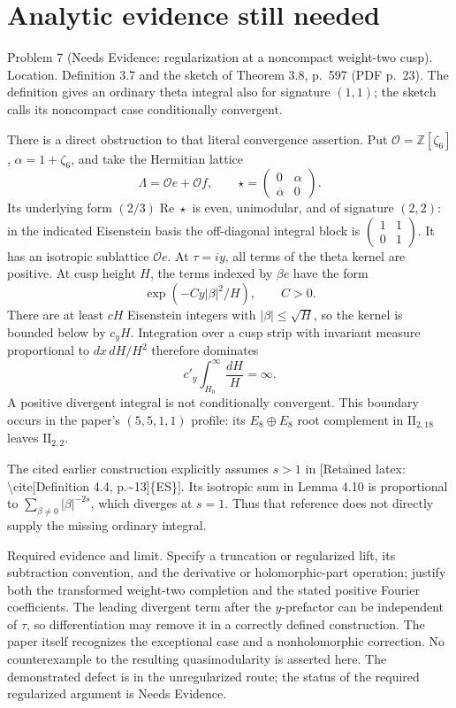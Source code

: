 \documentclass[10pt]{article}
\begin{document}
\section*{Analytic evidence still needed}
Problem 7 (Needs Evidence: regularization at a noncompact weight-two cusp).  Location. Definition 3.7 and the sketch of Theorem 3.8, p. 597 (PDF p. 23). The definition gives an ordinary theta integral also for signature \((1,1)\); the sketch calls its noncompact case conditionally convergent.\par
There is a direct obstruction to that literal convergence assertion. Put \(\mathcal O=\mathbb Z[\zeta_6]\), \(\alpha=1+\zeta_6\), and take the Hermitian lattice \[\Lambda=\mathcal Oe+\mathcal Of,\qquad
 \star=\begin{pmatrix}0&\alpha\\\overline\alpha&0\end{pmatrix}.\] Its underlying form \((2/3)\operatorname{Re}\star\) is even, unimodular, and of signature \((2,2)\): in the indicated Eisenstein basis the off-diagonal integral block is \(\left(\begin{smallmatrix}1&1\\0&1\end{smallmatrix}\right)\). It has an isotropic sublattice \(\mathcal Oe\). At \(\tau=iy\), all terms of the theta kernel are positive. At cusp height \(H\), the terms indexed by \(\beta e\) have the form \[\exp(-Cy|\beta|^2/H),\qquad C>0.\] There are at least \(cH\) Eisenstein integers with \(|\beta|\le\sqrt H\), so the kernel is bounded below by \(c_yH\). Integration over a cusp strip with invariant measure proportional to \(dx\,dH/H^2\) therefore dominates \[c'_y\int_{H_0}^{\infty}\frac{dH}{H}=\infty.\] A positive divergent integral is not conditionally convergent. This boundary occurs in the paper’s \((5,5,1,1)\) profile: its \(E_8\oplus E_8\) root complement in \(\mathrm{II}_{2,18}\) leaves \(\mathrm{II}_{2,2}\).\par
The cited earlier construction explicitly assumes \(s>1\) in [Retained latex: \textbackslash{}cite[Definition 4.4, p.\textasciitilde{}13]\{ES\}]. Its isotropic sum in Lemma 4.10 is proportional to \(\sum_{\beta\ne0}|\beta|^{-2s}\), which diverges at \(s=1\). Thus that reference does not directly supply the missing ordinary integral.\par
Required evidence and limit. Specify a truncation or regularized lift, its subtraction convention, and the derivative or holomorphic-part operation; justify both the transformed weight-two completion and the stated positive Fourier coefficients. The leading divergent term after the \(y\)-prefactor can be independent of \(\tau\), so differentiation may remove it in a correctly defined construction. The paper itself recognizes the exceptional case and a nonholomorphic correction. No counterexample to the resulting quasimodularity is asserted here. The demonstrated defect is in the unregularized route; the status of the required regularized argument is Needs Evidence.\par
\end{document}

